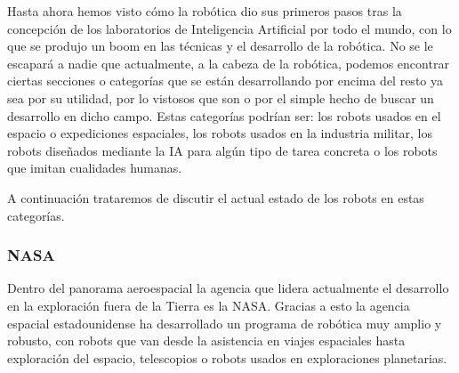Hasta ahora hemos visto cómo la robótica dio sus primeros pasos tras la concepción de los laboratorios de Inteligencia Artificial por todo el mundo, con lo que se produjo un boom en las técnicas y el desarrollo de la robótica. No se le escapará a nadie que actualmente, a la cabeza de la robótica, podemos encontrar ciertas secciones o categorías que se están desarrollando por encima del resto ya sea por su utilidad, por lo vistosos que son o por el simple hecho de buscar un desarrollo en dicho campo. Estas categorías podrían ser: los robots usados en el espacio o expediciones espaciales, los robots usados en la industria militar, los robots diseñados mediante la IA para algún tipo de tarea concreta o los robots que imitan cualidades humanas.

A continuación trataremos de discutir el actual estado de los robots en estas categorías.

\subsubsection{NASA}
Dentro del panorama aeroespacial la agencia que lidera actualmente el desarrollo en la exploración fuera de la Tierra es la NASA. Gracias a esto la agencia espacial estadounidense ha desarrollado un programa de robótica muy amplio y robusto, con robots que van desde la asistencia en viajes espaciales hasta exploración del espacio, telescopios o robots usados en exploraciones planetarias.

